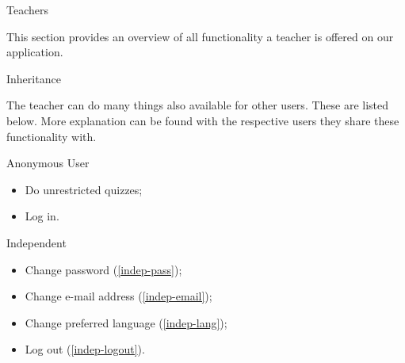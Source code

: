 
\begin{section}{Teachers}

    This section provides an overview of all functionality a teacher is offered
    on our application.

    \begin{subsection}{Inheritance}

        The teacher can do many things also available for other users. These are
        listed below. More explanation can be found with the respective users
        they share these functionality with.

        \begin{subsubsection}{Anonymous User}

            \begin{itemize}
                \item Do unrestricted quizzes;
                \item Log in.
            \end{itemize}

        \end{subsubsection}

        \begin{subsubsection}{Independent}

            \begin{itemize}
                \item Change password           (\ref{indep-pass});
                \item Change e-mail address     (\ref{indep-email});
                \item Change preferred language (\ref{indep-lang});
                \item Log out                   (\ref{indep-logout}).
            \end{itemize}

        \end{subsubsection}

    \end{subsection}


\end{section}
